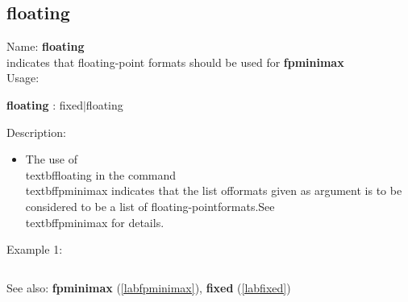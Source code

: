 \subsection{floating}
\label{labfloating}
\noindent Name: \textbf{floating}\\
indicates that floating-point formats should be used for \textbf{fpminimax}\\
\noindent Usage: 
\begin{center}
\textbf{floating} : \textsf{fixed$|$floating}\\
\end{center}
\noindent Description: \begin{itemize}

\item The use of \\textbf{floating} in the command \\textbf{fpminimax} indicates that the list of\n   formats given as argument is to be considered to be a list of floating-point\n   formats.\n   See \\textbf{fpminimax} for details.\n\end{itemize}
\noindent Example 1: 
\begin{center}\begin{minipage}{15cm}\begin{Verbatim}[frame=single]
\end{Verbatim}
\end{minipage}\end{center}
See also: \textbf{fpminimax} (\ref{labfpminimax}), \textbf{fixed} (\ref{labfixed})
